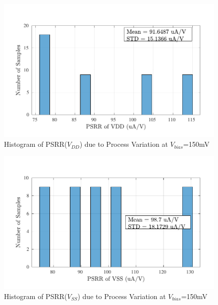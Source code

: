 \begin{figure} [H]
\centering
\includegraphics[scale=1]{Figures/Corners/Overall/Proc_Min/PDFs/Proc_Min_psrrp.pdf}
\caption{Histogram of PSRR($V_{DD}$) due to Process Variation at $V_{bias}$=150mV}
\end{figure}

\begin{figure} [H]
\centering
\includegraphics[scale=1]{Figures/Corners/Overall/Proc_Min/PDFs/Proc_Min_psrrn.pdf}
\caption{Histogram of PSRR($V_{SS}$) due to Process Variation at $V_{bias}$=150mV}
\end{figure}

